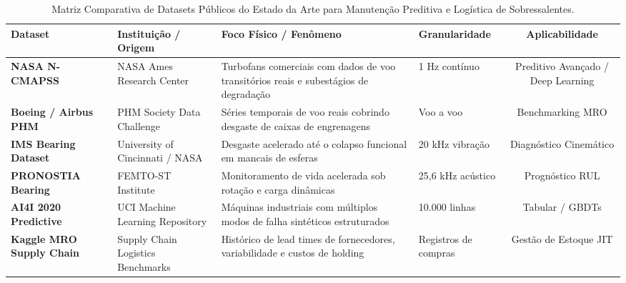 \begin{table}[H]
\centering
\scriptsize
\begin{tabularx}{\textwidth}{l X X l c}
\toprule
\textbf{Dataset} & \textbf{Instituição / Origem} & \textbf{Foco Físico / Fenômeno} & \textbf{Granularidade} & \textbf{Aplicabilidade} \\
\midrule
\textbf{NASA N-CMAPSS} & NASA Ames Research Center \cite{chao2022} & Turbofans comerciais com dados de voo transitórios reais e subestágios de degradação & 1 Hz contínuo & Preditivo Avançado / Deep Learning \\
\textbf{Boeing / Airbus PHM} & PHM Society Data Challenge & Séries temporais de voo reais cobrindo desgaste de caixas de engrenagens & Voo a voo & Benchmarking MRO \\
\textbf{IMS Bearing Dataset} & University of Cincinnati / NASA & Desgaste acelerado até o colapso funcional em mancais de esferas & 20 kHz vibração & Diagnóstico Cinemático \\
\textbf{PRONOSTIA Bearing} & FEMTO-ST Institute & Monitoramento de vida acelerada sob rotação e carga dinâmicas & 25,6 kHz acústico & Prognóstico RUL \\
\textbf{AI4I 2020 Predictive} & UCI Machine Learning Repository & Máquinas industriais com múltiplos modos de falha sintéticos estruturados & 10.000 linhas & Tabular / GBDTs \\
\textbf{Kaggle MRO Supply Chain} & Supply Chain Logistics Benchmarks & Histórico de lead times de fornecedores, variabilidade e custos de holding & Registros de compras & Gestão de Estoque JIT \\
\bottomrule
\end{tabularx}
\caption{Matriz Comparativa de Datasets Públicos do Estado da Arte para Manutenção Preditiva e Logística de Sobressalentes.}
\label{tab:pdm_datasets_benchmark}
\end{table}

